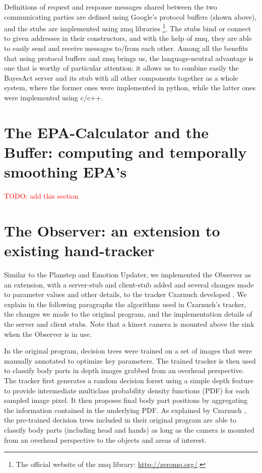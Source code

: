 Definitions of request and response messages shared between the two communicating parties are defined using Google's protocol buffers (shown above), and the stubs are implemented using zmq libraries \footnote{The official website of the zmq library: \url{http://zeromq.org/}.}. The stubs bind or connect to given addresses in their constructors, and with the help of zmq, they are able to easily send and receive messages to/from each other. Among all the benefits that using protocol buffers and zmq brings us, the language-neutral advantage is one that is worthy of particular attention: it allows us to combine easily the BayesAct server and its stub with all other components together as a whole system, where the former ones were implemented in python, while the latter ones were implemented using c/c++.


\section{The EPA-Calculator and the Buffer: computing and temporally smoothing EPA's}
\textcolor{red}{TODO: add this section}

\section{The Observer: an extension to existing hand-tracker}

Similar to the Planstep and Emotion Updater, we implemented the Observer as an extension, with a server-stub and client-stub added and several changes made to parameter values and other details, to the tracker Czarnuch developed \cite{czarnuch2014}. We explain in the following paragraphs the algorithms used in Czarnuch's tracker, the changes we made to the original program, and the implementation details of the server and client stubs. Note that a kinect camera is mounted above the sink when the Observer is in use.

In the original program, decision trees were trained on a set of images that were manually annotated to optimize key parameters. The trained tracker is then used to classify body parts in depth images grabbed from an overhead perspective. The tracker first generates a random decision forest using a simple depth feature to provide intermediate multiclass probability density functions (PDF) for each sampled image pixel. It then proposes final body part positions by aggregating the information contained in the underlying PDF. As explained by Czarnuch \cite{czarnuch2014}, the pre-trained decision trees included in their original program are able to classify body parts (including head and hands) as long as the camera is mounted from an overhead perspective to the objects and areas of interest. 

